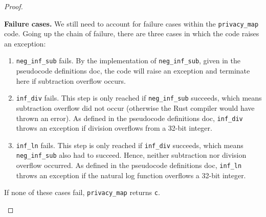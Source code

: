 \documentclass[11pt,a4paper]{article}
\newcommand{\vicki}[1]{{ {\color{olive}{(vicki)~#1}}}}
\newcommand{\zach}[1]{{ {\color{red}{(zach)~#1}}}}
\theoremstyle{definition}
\begin{document}
\begin{proof}
\begin{enumerate}
    \textbf{Failure cases.} We still need to account for failure cases within the \texttt{privacy\_map} code. Going up the chain of failure, there are three cases in which the code raises an exception: %
    \begin{enumerate}
        \item \texttt{neg\_inf\_sub} fails. By the implementation of \texttt{neg\_inf\_sub}, given in the pseudocode definitions doc, the code will raise an exception and terminate here if subtraction overflow occurs. 
        \item \texttt{inf\_div} fails. This step is only reached if \texttt{neg\_inf\_sub} succeeds, which means subtraction overflow did not occur (otherwise the Rust compiler would have thrown an error). As defined in the pseudocode definitions doc, \texttt{inf\_div} throws an exception if division overflows from a 32-bit integer. 
        \item \texttt{inf\_ln} fails. This step is only reached if \texttt{inf\_div} succeeds, which means \texttt{neg\_inf\_sub} also had to succeed. Hence, neither subtraction nor division overflow occurred. As defined in the pseudocode definitions doc, \texttt{inf\_ln} throws an exception if the natural log function overflows a 32-bit integer. 
    \end{enumerate}
    
    If none of these cases fail, \texttt{privacy\_map} returns \texttt{c}. 
    
\end{enumerate}
\end{proof}
\end{document}
